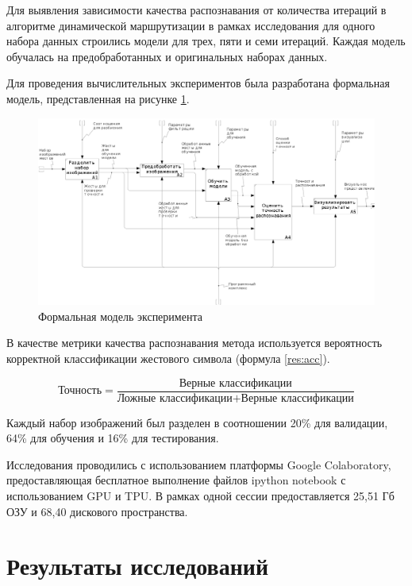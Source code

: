 Для выявления зависимости качества распознавания от количества итераций в алгоритме динамической маршрутизации в рамках исследования для одного набора данных строились модели для трех, пяти и семи итераций. Каждая модель обучалась на предобработанных и оригинальных наборах данных.

Для проведения вычислительных экспериментов была разработана формальная модель, представленная на рисунке \ref{res:research}.

\begin{figure}
	\centering
	\includegraphics[width=\textwidth]{inc/img/research}
	\caption{Формальная модель эксперимента}
	\label{res:research}
\end{figure}

В качестве метрики качества распознавания метода используется вероятность корректной классификации жестового символа (формула \ref{res:acc}).

\begin{equation}
\label{res:acc}
\text{Точность} = \frac{\text{Верные классификации}}{\text{Ложные классификации} + \text{Верные классификации}}
\end{equation}

Каждый набор изображений был разделен в соотношении 20\% для валидации, 64\% для обучения и 16\% для тестирования.

Исследования проводились с использованием платформы Google Colaboratory, предоставляющая бесплатное выполнение файлов ipython notebook с использованием GPU и TPU. В рамках одной сессии предоставляется 25,51 Гб ОЗУ и 68,40 дискового пространства.

\section{Результаты исследований}

